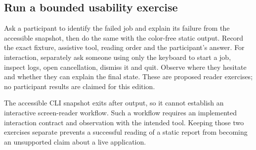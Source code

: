 \subsection{Run a bounded usability exercise}

Ask a participant to identify the failed job and explain its failure from the accessible snapshot, then do the same with the color-free static output. Record the exact fixture, assistive tool, reading order and the participant’s answer. For interaction, separately ask someone using only the keyboard to start a job, inspect logs, open cancellation, dismiss it and quit. Observe where they hesitate and whether they can explain the final state. These are proposed reader exercises; no participant results are claimed for this edition.

The accessible CLI snapshot exits after output, so it cannot establish an interactive screen-reader workflow. Such a workflow requires an implemented interaction contract and observation with the intended tool. Keeping those two exercises separate prevents a successful reading of a static report from becoming an unsupported claim about a live application.
